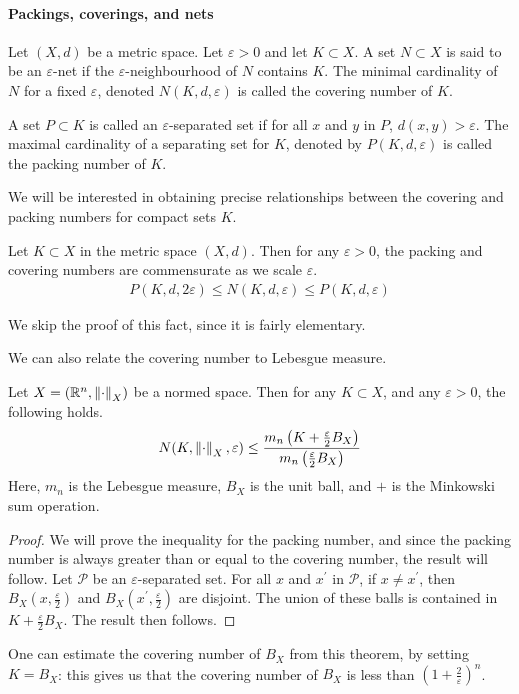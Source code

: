 \documentclass[11pt]{article}
\begin{document}
\paragraph{Packings, coverings, and nets}

\begin{definition}
  Let $(X, d)$ be a metric space.
  Let $\varepsilon > 0$ and let $K \subset X$.
  A set $N \subset X$ is said to be an $\varepsilon$-net if the $\varepsilon$-neighbourhood of $N$ contains $K$.
  The minimal cardinality of $N$ for a fixed $\varepsilon$, denoted $N(K, d, \varepsilon)$ is called the covering number of $K$.
\end{definition}

\begin{definition}
  A set $P \subset K$ is called an $\varepsilon$-separated set if for all $x$ and $y$ in $P$, $d(x,y) > \varepsilon$.
  The maximal cardinality of a separating set for $K$, denoted by $P(K, d, \varepsilon)$ is called the packing number of $K$.
\end{definition}

We will be interested in obtaining precise relationships between the covering and packing numbers for compact sets $K$.

\begin{lemma}
  Let $K \subset X$ in the metric space $(X, d)$.
  Then for any $\varepsilon > 0$, the packing and covering numbers are commensurate as we scale $\varepsilon$.
  \begin{align*}
    P(K, d, 2 \varepsilon) \leq N(K, d, \varepsilon) \leq P(K, d, \varepsilon)
  \end{align*}
\end{lemma}
We skip the proof of this fact, since it is fairly elementary.

We can also relate the covering number to Lebesgue measure.
\begin{theorem}
  Let $X = \left( \mathbb{R}^n, \left\lVert\cdot\right\rVert_X \right)$ be a normed space.
  Then for any $K \subset X$, and any $\varepsilon > 0$, the following holds.
  \begin{align*}
    N(K, \left\lVert\cdot\right\rVert_X, \varepsilon) \leq \frac{m_n\left( K+\frac{\varepsilon}{2}B_X \right)}{m_n \left( \frac{\varepsilon}{2}B_X \right)}
  \end{align*}
  Here, $m_n$ is the Lebesgue measure, $B_X$ is the unit ball, and $+$ is the Minkowski sum operation.
\end{theorem}
\begin{proof}
  We will prove the inequality for the packing number, and since the packing number is always greater than or equal to the covering number, the result will follow.
  Let $\mathcal{P}$ be an $\varepsilon$-separated set.
  For all $x$ and $x^{\prime}$ in $\mathcal{P}$, if $x \neq x^{\prime}$, then $B_X\left( x, \frac{\varepsilon}{2} \right)$ and $B_X\left( x^{\prime}, \frac{\varepsilon}{2} \right)$ are disjoint.
  The union of these balls is contained in $K + \frac{\varepsilon}{2}B_X$.
  The result then follows.
\end{proof}
One can estimate the covering number of $B_X$ from this theorem, by setting $K = B_X$: this gives us that the covering number of $B_X$ is less than $\left( 1 + \frac{2}{\varepsilon} \right)^n$.
\end{document}
